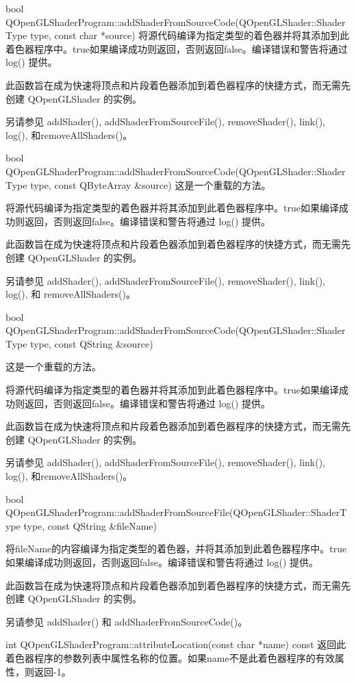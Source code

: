bool QOpenGLShaderProgram::addShaderFromSourceCode(QOpenGLShader::ShaderType type, const char *source)
将源代码编译为指定类型的着色器并将其添加到此着色器程序中。true如果编译成功则返回，否则返回false。编译错误和警告将通过 log() 提供。

此函数旨在成为快速将顶点和片段着色器添加到着色器程序的快捷方式，而无需先创建 QOpenGLShader 的实例。

另请参见 addShader(), addShaderFromSourceFile(), removeShader(), link(), log(), 和removeAllShaders()。

bool QOpenGLShaderProgram::addShaderFromSourceCode(QOpenGLShader::ShaderType type, const QByteArray \&source)
这是一个重载的方法。

将源代码编译为指定类型的着色器并将其添加到此着色器程序中。true如果编译成功则返回，否则返回false。编译错误和警告将通过 log() 提供。

此函数旨在成为快速将顶点和片段着色器添加到着色器程序的快捷方式，而无需先创建 QOpenGLShader 的实例。

另请参见 addShader(), addShaderFromSourceFile(), removeShader(), link(), log(), 和 removeAllShaders()。

bool QOpenGLShaderProgram::addShaderFromSourceCode(QOpenGLShader::ShaderType type, const QString \&source)

这是一个重载的方法。

将源代码编译为指定类型的着色器并将其添加到此着色器程序中。true如果编译成功则返回，否则返回false。编译错误和警告将通过 log() 提供。

此函数旨在成为快速将顶点和片段着色器添加到着色器程序的快捷方式，而无需先创建 QOpenGLShader 的实例。

另请参见 addShader(), addShaderFromSourceFile(), removeShader(), link(), log(), 和removeAllShaders()。

bool QOpenGLShaderProgram::addShaderFromSourceFile(QOpenGLShader::ShaderType type, const QString \&fileName)

将fileName的内容编译为指定类型的着色器，并将其添加到此着色器程序中。true如果编译成功则返回，否则返回false。编译错误和警告将通过 log() 提供。

此函数旨在成为快速将顶点和片段着色器添加到着色器程序的快捷方式，而无需先创建 QOpenGLShader 的实例。

另请参见 addShader() 和 addShaderFromSourceCode()。

int QOpenGLShaderProgram::attributeLocation(const char *name) const
返回此着色器程序的参数列表中属性名称的位置。如果name不是此着色器程序的有效属性，则返回-1。

